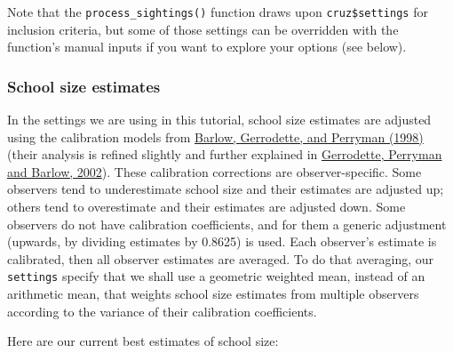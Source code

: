 \documentclass[
]{book}
\newenvironment{Shaded}{\begin{snugshade}}{\end{snugshade}}
\newcommand{\DecValTok}[1]{\textcolor[rgb]{0.00,0.00,0.81}{#1}}
\newcommand{\FloatTok}[1]{\textcolor[rgb]{0.00,0.00,0.81}{#1}}
\newcommand{\KeywordTok}[1]{\textcolor[rgb]{0.13,0.29,0.53}{\textbf{#1}}}
\newcommand{\NormalTok}[1]{#1}
\newcommand{\OperatorTok}[1]{\textcolor[rgb]{0.81,0.36,0.00}{\textbf{#1}}}
\newcommand{\StringTok}[1]{\textcolor[rgb]{0.31,0.60,0.02}{#1}}
\begin{document}
Note that the \texttt{process\_sightings()} function draws upon \texttt{cruz\$settings} for inclusion criteria, but some of those settings can be overridden with the function's manual inputs if you want to explore your options (see below).

\hypertarget{ss_calibration}{%
\subsubsection*{School size estimates}\label{ss_calibration}}

In the settings we are using in this tutorial, school size estimates are adjusted using the calibration models from \href{https://scholar.google.com/scholar?hl=en\&as_sdt=0\%2C43\&q=barlow+1998+group+size+caliration\&btnG=}{Barlow, Gerrodette, and Perryman (1998)} (their analysis is refined slightly and further explained in \href{https://scholar.google.com/scholar?hl=en\&as_sdt=0\%2C43\&q=barlow+1998+group+size+caliration\&btnG=}{Gerrodette, Perryman and Barlow, 2002}). These calibration corrections are observer-specific. Some observers tend to underestimate school size and their estimates are adjusted up; others tend to overestimate and their estimates are adjusted down. Some observers do not have calibration coefficients, and for them a generic adjustment (upwards, by dividing estimates by 0.8625) is used. Each observer's estimate is calibrated, then all observer estimates are averaged. To do that averaging, our \texttt{settings} specify that we shall use a geometric weighted mean, instead of an arithmetic mean, that weights school size estimates from multiple observers according to the variance of their calibration coefficients.

Here are our current best estimates of school size:

\begin{Shaded}
\end{Shaded}
\end{document}

